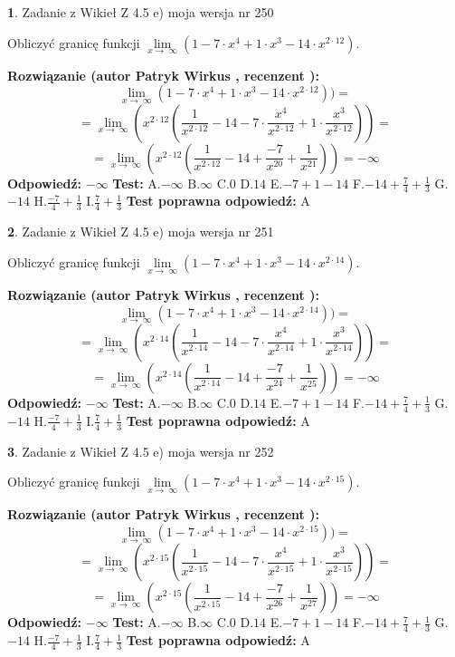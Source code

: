 \documentclass[12pt, a4paper]{article}
\theoremstyle{definition} %
\newtheorem{zad}{}
\newcommand{\zadStart}[1]{\begin{zad}#1\newline}
\newcommand{\zadStop}{\end{zad}}
\newcommand{\rozwStart}[2]{\noindent \textbf{Rozwiązanie (autor #1 , recenzent #2): }\newline}
\newcommand{\rozwStop}{\newline}
\newcommand{\odpStart}{\noindent \textbf{Odpowiedź:}\newline}
\newcommand{\odpStop}{\newline}
\newcommand{\testStart}{\noindent \textbf{Test:}\newline}
\newcommand{\testStop}{\newline}
\newcommand{\kluczStart}{\noindent \textbf{Test poprawna odpowiedź:}\newline}
\newcommand{\kluczStop}{\newline}
\begin{document}
\zadStart{Zadanie z Wikieł Z 4.5 e) moja wersja nr 250}



Obliczyć granicę funkcji  $\lim\limits_{x\to\ \infty}(1 - 7 \cdot x^{4}+1 \cdot x^{3}- 14 \cdot x^{2\cdot12})$.
\zadStop
\rozwStart{Patryk Wirkus}{}
$$\lim\limits_{x\to\ \infty}(1 - 7 \cdot x^{4}+1 \cdot x^{3}- 14 \cdot x^{2\cdot12}))=$$
$$=\lim\limits_{x\to\ \infty}(x^{2\cdot12}(\frac{1}{x^{2\cdot12}}-14 -7 \cdot \frac{x^{4}}{x^{2\cdot12}}+1 \cdot \frac{x^{3}}{x^{2\cdot12}}))=$$
$$=\lim\limits_{x\to\ \infty}(x^{2\cdot12}(\frac{1}{x^{2\cdot12}}-14 + \frac{-7}{x^{20}}+ \frac{1}{x^{21}}))=-\infty$$
\rozwStop
\odpStart
$-\infty$
\odpStop
\testStart
A.$-\infty$ B.$\infty$ C.$0$ D.$14$ E.$-7 + 1 - 14$
F.$-14+\frac{7}{4}+\frac{1}{3}$ G.$-14$
H.$\frac{-7}{4}+\frac{1}{3}$
I.$\frac{7}{4}+\frac{1}{3}$
\testStop
\kluczStart
A
\kluczStop



\zadStart{Zadanie z Wikieł Z 4.5 e) moja wersja nr 251}



Obliczyć granicę funkcji  $\lim\limits_{x\to\ \infty}(1 - 7 \cdot x^{4}+1 \cdot x^{3}- 14 \cdot x^{2\cdot14})$.
\zadStop
\rozwStart{Patryk Wirkus}{}
$$\lim\limits_{x\to\ \infty}(1 - 7 \cdot x^{4}+1 \cdot x^{3}- 14 \cdot x^{2\cdot14}))=$$
$$=\lim\limits_{x\to\ \infty}(x^{2\cdot14}(\frac{1}{x^{2\cdot14}}-14 -7 \cdot \frac{x^{4}}{x^{2\cdot14}}+1 \cdot \frac{x^{3}}{x^{2\cdot14}}))=$$
$$=\lim\limits_{x\to\ \infty}(x^{2\cdot14}(\frac{1}{x^{2\cdot14}}-14 + \frac{-7}{x^{24}}+ \frac{1}{x^{25}}))=-\infty$$
\rozwStop
\odpStart
$-\infty$
\odpStop
\testStart
A.$-\infty$ B.$\infty$ C.$0$ D.$14$ E.$-7 + 1 - 14$
F.$-14+\frac{7}{4}+\frac{1}{3}$ G.$-14$
H.$\frac{-7}{4}+\frac{1}{3}$
I.$\frac{7}{4}+\frac{1}{3}$
\testStop
\kluczStart
A
\kluczStop



\zadStart{Zadanie z Wikieł Z 4.5 e) moja wersja nr 252}



Obliczyć granicę funkcji  $\lim\limits_{x\to\ \infty}(1 - 7 \cdot x^{4}+1 \cdot x^{3}- 14 \cdot x^{2\cdot15})$.
\zadStop
\rozwStart{Patryk Wirkus}{}
$$\lim\limits_{x\to\ \infty}(1 - 7 \cdot x^{4}+1 \cdot x^{3}- 14 \cdot x^{2\cdot15}))=$$
$$=\lim\limits_{x\to\ \infty}(x^{2\cdot15}(\frac{1}{x^{2\cdot15}}-14 -7 \cdot \frac{x^{4}}{x^{2\cdot15}}+1 \cdot \frac{x^{3}}{x^{2\cdot15}}))=$$
$$=\lim\limits_{x\to\ \infty}(x^{2\cdot15}(\frac{1}{x^{2\cdot15}}-14 + \frac{-7}{x^{26}}+ \frac{1}{x^{27}}))=-\infty$$
\rozwStop
\odpStart
$-\infty$
\odpStop
\testStart
A.$-\infty$ B.$\infty$ C.$0$ D.$14$ E.$-7 + 1 - 14$
F.$-14+\frac{7}{4}+\frac{1}{3}$ G.$-14$
H.$\frac{-7}{4}+\frac{1}{3}$
I.$\frac{7}{4}+\frac{1}{3}$
\testStop
\kluczStart
A
\kluczStop
\end{document}
